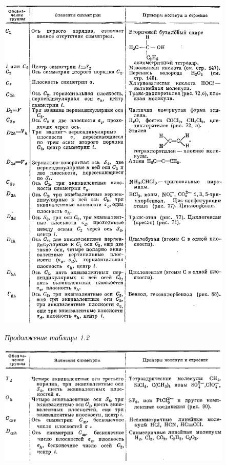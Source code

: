 \begin{figure}[tbp]

\centerline{\hbox{\includegraphics[scale=1]{Ris/ris_eps/tab1_02.eps}}}

\end{figure}

\begin{figure}[tbp]
{\itshape\small Продолжение таблицы 1.2}

\centerline{\hbox{\includegraphics[scale=1]{Ris/ris_eps/tab1_02a.eps}}}


\end{figure}

